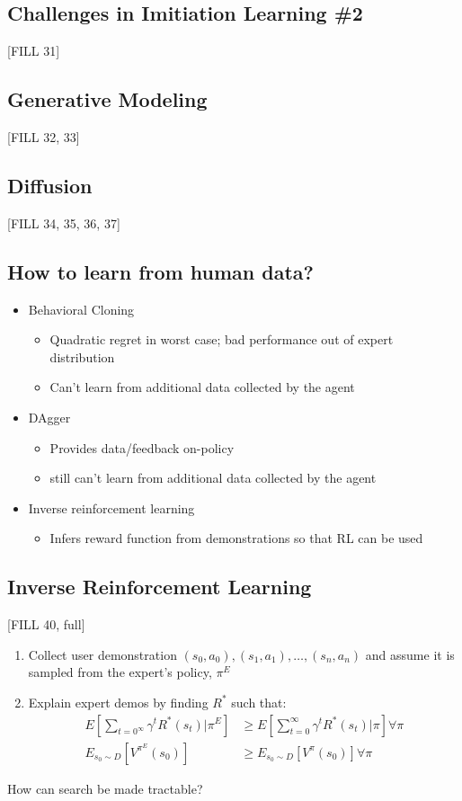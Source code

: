 \documentclass[10pt]{article}
\begin{document}
\subsection*{Challenges in Imitiation Learning \#2}
[FILL 31]

\subsection*{Generative Modeling}
[FILL 32, 33]

\subsection*{Diffusion}
[FILL 34, 35, 36, 37]

\subsection*{How to learn from human data?}
\begin{itemize}
	\item Behavioral Cloning
	\begin{itemize}
        \item Quadratic regret in worst case; bad performance out of expert distribution
        \item Can't learn from additional data collected by the agent
    \end{itemize}
	\item DAgger
	\begin{itemize}
        \item Provides data/feedback on-policy
        \item still can't learn from additional data collected by the agent
    \end{itemize}
    \item Inverse reinforcement learning
    \begin{itemize}
        \item Infers reward function from demonstrations so that RL can be used
    \end{itemize}
\end{itemize}

\subsection*{Inverse Reinforcement Learning}
[FILL 40, full]

\begin{enumerate}
    \item Collect user demonstration $(s_0, a_0), (s_1, a_1), \dots, (s_n, a_n)$ and assume it is sampled from the expert's policy, $\pi^E$
    \item Explain expert demos by finding $R^*$ such that:
    \begin{align*}
        E[\sum_{t = 0^\infty} \gamma^t R^* (s_t) | \pi^E] &\geq E[\sum_{t = 0}^\infty \gamma^t R^* (s_t) | \pi] \forall \pi\\
        E_{s_0 \sim D} [V^{\pi^E} (s_0)] &\geq E_{s_0 \sim D}[V^\pi (s_0)] \forall \pi
    \end{align*}
\end{enumerate}
How can search be made tractable?
\end{document}
